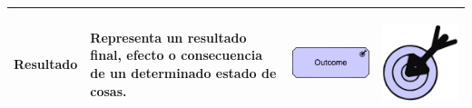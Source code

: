 \begin{longtable}{|p{0.15\linewidth}|p{0.45\linewidth}|p{0.2\linewidth} p{0.2\linewidth}|}
    Resultado &
    Representa un resultado final, efecto o consecuencia de un determinado estado de cosas. &
\begin{center}
    \includegraphics[width=1\linewidth]{imgs/capa_motivacional/outcome1.pdf}
\end{center} &
\begin{center}
    \includegraphics[width=0.5\linewidth]{imgs/capa_motivacional/outcome2.pdf}
\end{center}
    \\ \hline


\end{longtable}
